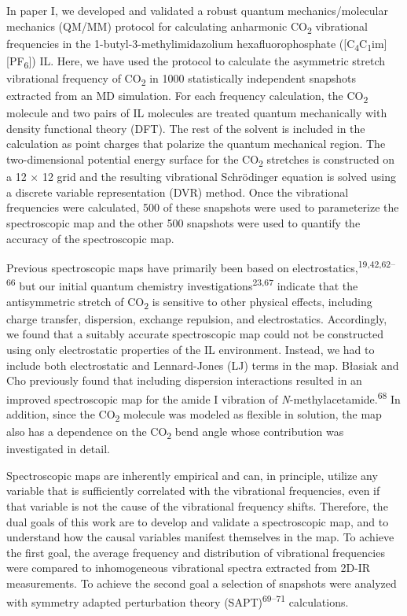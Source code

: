 \documentclass[]{article}
\begin{document}
In paper I, we developed and validated a robust quantum mechanics/molecular mechanics (QM/MM) protocol for calculating anharmonic CO\textsubscript{2} vibrational frequencies in the 1-butyl-3-methylimidazolium hexafluorophosphate ({[}C\textsubscript{4}C\textsubscript{1}im{]}{[}PF\textsubscript{6}{]}) IL. Here, we have used the protocol to calculate the asymmetric stretch vibrational frequency of CO\textsubscript{2} in 1000 statistically independent snapshots extracted from an MD simulation. For each frequency calculation, the CO\textsubscript{2} molecule and two pairs of IL molecules are treated quantum mechanically with density functional theory (DFT). The rest of the solvent is included in the calculation as point charges that polarize the quantum mechanical region. The two-dimensional potential energy surface for the CO\textsubscript{2} stretches is constructed on a 12 × 12 grid and the resulting vibrational Schrödinger equation is solved using a discrete variable representation (DVR) method. Once the vibrational frequencies were calculated, 500 of these snapshots were used to parameterize the spectroscopic map and the other 500 snapshots were used to quantify the accuracy of the spectroscopic map.

Previous spectroscopic maps have primarily been based on electrostatics,\textsuperscript{19,42,62--66} but our initial quantum chemistry investigations\textsuperscript{23,67} indicate that the antisymmetric stretch of CO\textsubscript{2} is sensitive to other physical effects, including charge transfer, dispersion, exchange repulsion, and electrostatics. Accordingly, we found that a suitably accurate spectroscopic map could not be constructed using only electrostatic properties of the IL environment. Instead, we had to include both electrostatic and Lennard-Jones (LJ) terms in the map.  Błasiak and Cho previously found that including dispersion interactions resulted in an improved spectroscopic map for the amide I vibration of \emph{N}-methylacetamide.\textsuperscript{68} In addition, since the CO\textsubscript{2} molecule was modeled as flexible in solution, the map also has a dependence on the CO\textsubscript{2} bend angle whose contribution was investigated in detail.

Spectroscopic maps are inherently empirical and can, in principle, utilize any variable that is sufficiently correlated with the vibrational frequencies, even if that variable is not the cause of the vibrational frequency shifts. Therefore, the dual goals of this work are to develop and validate a spectroscopic map, and to understand how the causal variables manifest themselves in the map. To achieve the first goal, the average frequency and distribution of vibrational frequencies were compared to inhomogeneous vibrational spectra extracted from 2D-IR measurements. To achieve the second goal a selection of snapshots were analyzed with symmetry adapted perturbation theory (SAPT)\textsuperscript{69--71} calculations.
\end{document}
